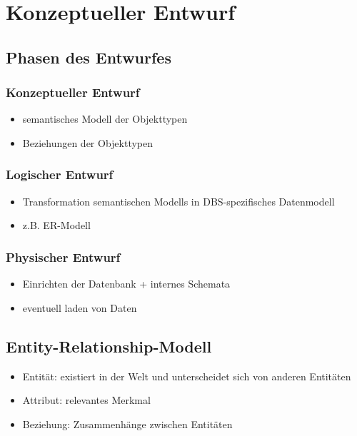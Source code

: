 \documentclass[a4paper]{article}
\begin{document}
\vspace{5mm}

\section{Konzeptueller Entwurf}

\subsection{Phasen des Entwurfes}
\subsubsection{Konzeptueller Entwurf}
\begin{itemize}
    \item semantisches Modell der Objekttypen
    \item Beziehungen der Objekttypen
\end{itemize}

\subsubsection{Logischer Entwurf}
\begin{itemize}
    \item Transformation semantischen Modells in DBS-spezifisches Datenmodell
    \item z.B. ER-Modell
\end{itemize}

\subsubsection{Physischer Entwurf}
\begin{itemize}
    \item Einrichten der Datenbank + internes Schemata
    \item eventuell laden von Daten
\end{itemize}

\subsection{Entity-Relationship-Modell}
\begin{itemize}
    \item Entität: existiert in der Welt und unterscheidet sich von anderen Entitäten
    \item Attribut: relevantes Merkmal
    \item Beziehung: Zusammenhänge zwischen Entitäten
\end{itemize}
\end{document}
